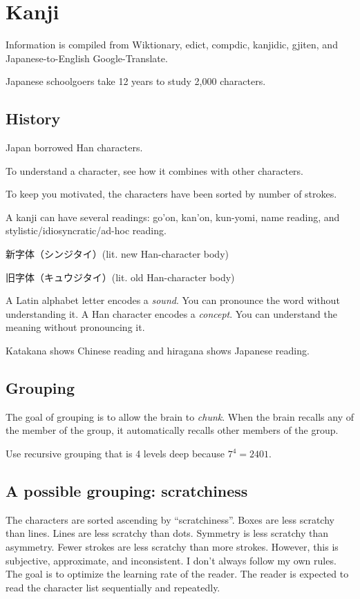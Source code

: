\chapter{Kanji}

Information is compiled from Wiktionary,
edict, compdic, kanjidic, gjiten,
and Japanese-to-English Google-Translate.

Japanese schoolgoers take 12 years to study 2,000 characters.

\section{History}

Japan borrowed Han characters.

To understand a character, see how it combines with other characters.

To keep you motivated, the characters have been sorted by number of strokes.

A kanji can have several readings:
go'on, kan'on, kun-yomi, name reading, and stylistic/idiosyncratic/ad-hoc reading.

新字体（シンジタイ）(lit. new Han-character body)

旧字体（キュウジタイ）(lit. old Han-character body)

A Latin alphabet letter encodes a \emph{sound}.
You can pronounce the word without understanding it.
A Han character encodes a \emph{concept}.
You can understand the meaning without pronouncing it.

Katakana shows Chinese reading and hiragana shows Japanese reading.

\section{Grouping}

The goal of grouping is to allow the brain to \emph{chunk}.
When the brain recalls any of the member of the group,
it automatically recalls other members of the group.

Use recursive grouping that is 4 levels deep because \(7^4 = 2401\).

\section{A possible grouping: scratchiness}

The characters are sorted ascending by ``scratchiness''.
Boxes are less scratchy than lines.
Lines are less scratchy than dots.
Symmetry is less scratchy than asymmetry.
Fewer strokes are less scratchy than more strokes.
However, this is subjective, approximate, and inconsistent.
I don't always follow my own rules.
The goal is to optimize the learning rate of the reader.
The reader is expected to read the character list
sequentially and repeatedly.

